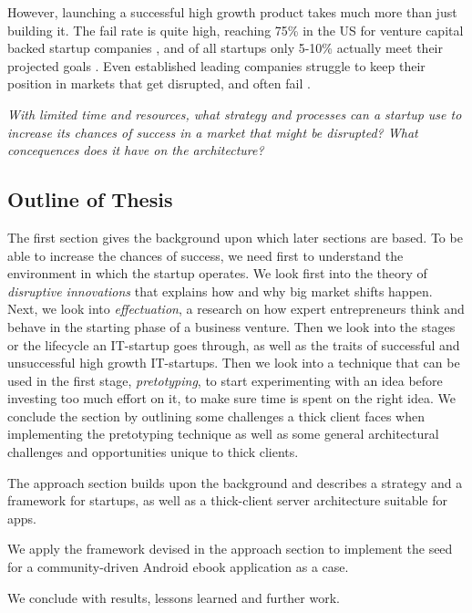 \documentclass[a4paper,10pt]{book}
\begin{document}
However, launching a successful high growth product takes much more than just building it. The fail rate is quite high, 
reaching 75\% in the US for venture capital backed startup companies \cite{pressArticleStartupsFailure75percent}, and of all startups only 5-10\% 
actually meet their projected goals \cite{pressArticleStartupsFailureUpTo95percent}. Even established leading companies 
struggle to keep their position in markets that get disrupted, and often fail \cite{innovatorsSolution}. 	

\emph{With limited time and resources, what strategy and processes can a startup use to increase its chances of success in a market 
 that might be disrupted? 
 What concequences does it have on the architecture?} 

\subsection{Outline of Thesis}
The first section gives the background upon which later sections are based. 
To be able to increase the chances of success, we need first to understand the environment in which the startup operates. 
We look first into the theory of \emph{disruptive innovations} that explains how and why big market shifts happen.
Next, we look into \emph{effectuation}, a research on how expert entrepreneurs think and behave in the starting phase of a business venture.
Then we look into the stages or the lifecycle an IT-startup goes through, as well as the traits of successful and unsuccessful high growth IT-startups. 
Then we look into a technique that can be used in the first stage, \emph{pretotyping}, to start experimenting with an idea before 
investing too much effort on it, to make sure time is spent on the right idea.
We conclude the section by outlining some challenges a thick client faces when implementing the pretotyping technique 
as well as some general architectural challenges and opportunities unique to thick clients.

The approach section builds upon the background and describes a strategy and a framework for startups, 
as well as a thick-client server architecture suitable for apps. 

We apply the framework devised in the approach section to implement the seed for a community-driven Android ebook application as a case. 

We conclude with results, lessons learned and further work.

\end{document}
